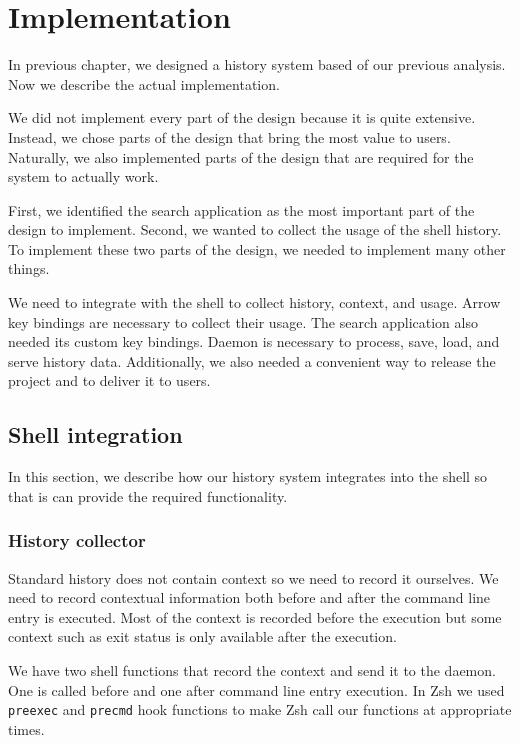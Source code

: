 \chapter{Implementation}

In previous chapter, we designed a history system based of our previous analysis. Now we describe the actual implementation. 

We did not implement every part of the design because it is quite extensive. Instead, we chose parts of the design that bring the most value to users. Naturally, we also implemented parts of the design that are required for the system to actually work.

First, we identified the search application as the most important part of the design to implement. Second, we wanted to collect the usage of the shell history. To implement these two parts of the design, we needed to implement many other things. 

We need to integrate with the shell to collect history, context, and usage. Arrow key bindings are necessary to collect their usage. The search application also needed its custom key bindings. Daemon is necessary to process, save, load, and serve history data. Additionally, we also needed a convenient way to release the project and to deliver it to users.

\section{Shell integration}

In this section, we describe how our history system integrates into the shell so that is can provide the required functionality. 

\subsection{History collector}

Standard history does not contain context so we need to record it ourselves. 
We need to record contextual information both before and after the command line entry is executed. Most of the context is recorded before the execution but some context such as exit status is only available after the execution. 

We have two shell functions that record the context and send it to the daemon. One is called before and one after command line entry execution. In Zsh we used \verb|preexec| and \verb|precmd| hook functions to make Zsh call our functions at appropriate times. 


